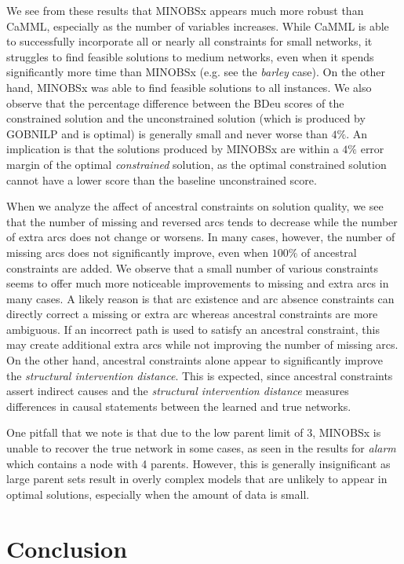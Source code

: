 \documentclass[twoside,11pt]{article}
\begin{document}
\medskip
We see from these results that MINOBSx appears much more robust than CaMML, especially as the number of variables increases. While CaMML is able to successfully
incorporate all or nearly all constraints for small networks, it struggles to find feasible solutions to medium networks, even when it spends significantly more time than MINOBSx
(e.g. see the \emph{barley} case). On the other hand, MINOBSx was able to find feasible solutions to all instances. We also observe that the percentage difference between
the BDeu scores of the constrained solution and the unconstrained solution (which is produced by GOBNILP and is optimal) is generally small and never worse than $4\%$. 
An implication is that the solutions produced by MINOBSx are within a $4\%$ error margin of the optimal \emph{constrained} solution, as the optimal constrained solution
cannot have a lower score than the baseline unconstrained score. 

\medskip
When we analyze the affect of ancestral constraints on solution quality, we see that the number of missing and reversed arcs tends to decrease while the number of extra arcs
does not change or worsens. In many cases, however, the number of missing arcs does not significantly improve, even when $100\%$ of ancestral constraints are added.
We observe that a small number of various constraints seems to offer much more noticeable improvements to missing and extra arcs in many cases. 
 A likely reason is that arc existence and arc absence constraints can directly correct a missing or extra arc whereas ancestral constraints are 
more ambiguous. If an incorrect path is used to satisfy an ancestral constraint, this may create additional extra arcs while not improving the number of missing arcs. 
On the other hand, ancestral constraints alone appear to significantly improve the \emph{structural intervention distance}. This is expected, since ancestral constraints assert
indirect causes and the \emph{structural intervention distance} measures differences in causal statements between the learned and true networks. 

\medskip
One pitfall that we note is that due to the low parent limit of 3, MINOBSx is unable to recover the true network in some cases, as seen in the results for \emph{alarm} which
contains a node with 4 parents. However, this is generally insignificant as large parent sets result in overly complex models that are unlikely to appear in optimal
solutions, especially when the amount of data is small. 


\section{Conclusion}
\end{document}
